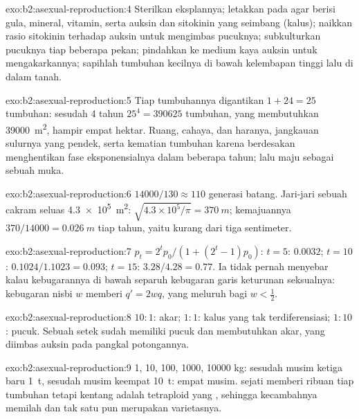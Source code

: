 \begin{solution}{exo:b2:asexual-reproduction:4}
Sterilkan eksplannya; letakkan pada agar berisi gula, mineral, vitamin,
serta auksin dan sitokinin yang seimbang (kalus); naikkan rasio
sitokinin terhadap auksin untuk mengimbas pucuknya; subkulturkan
pucuknya tiap beberapa pekan; pindahkan ke medium kaya auksin untuk
mengakarkannya; sapihlah tumbuhan kecilnya di bawah kelembapan tinggi
lalu di dalam tanah.
\end{solution}

\begin{solution}{exo:b2:asexual-reproduction:5}
Tiap tumbuhannya digantikan $1 + 24 = 25$ tumbuhan: sesudah 4 tahun $25^{4} =
\num{390625}$ tumbuhan, yang membutuhkan \qty{39000}{m^2},
hampir empat hektar. Ruang, cahaya, dan haranya, jangkauan sulurnya yang
pendek, serta kematian tumbuhan karena berdesakan menghentikan fase
eksponensialnya dalam beberapa tahun;  lalu maju sebagai sebuah
muka.
\end{solution}

\begin{solution}{exo:b2:asexual-reproduction:6}
$\num{14000}/130 \approx 110$ generasi batang. Jari-jari sebuah cakram
seluas \qty{4.3e5}{m^2}: $\sqrt{4.3\times 10^{5}/\pi} = \qty{370}{m}$;
kemajuannya $370/\num{14000} = \qty{0.026}{m}$ tiap tahun, yaitu kurang
dari tiga sentimeter.
\end{solution}

\begin{solution}{exo:b2:asexual-reproduction:7}
$p_t = 2^{t}p_0/(1 + (2^{t} - 1)p_0)$: $t = 5$: $0.0032$; $t = 10$:
$0.1024/1.1023 = 0.093$; $t = 15$: $3.28/4.28 = 0.77$. Ia tidak pernah
menyebar kalau kebugarannya di bawah separuh kebugaran garis keturunan
seksualnya: kebugaran nisbi $w$ memberi $q' = 2wq$, yang meluruh bagi $w <
\tfrac12$.
\end{solution}

\begin{solution}{exo:b2:asexual-reproduction:8}
$10 : 1$: akar; $1 : 1$: kalus yang tak terdiferensiasi; $1 : 10$:
pucuk. Sebuah setek sudah memiliki pucuk dan membutuhkan akar, yang
diimbas auksin pada pangkal potongannya.
\end{solution}

\begin{solution}{exo:b2:asexual-reproduction:9}
1, 10, 100, \num{1000}, \num{10000} kg: sesudah musim ketiga baru
\qty{1}{t}, sesudah musim keempat \qty{10}{t}: empat musim.  sejati
memberi ribuan  tiap tumbuhan tetapi kentang adalah tetraploid yang
, sehingga kecambahnya memilah dan tak satu pun merupakan
varietasnya.
\end{solution}

